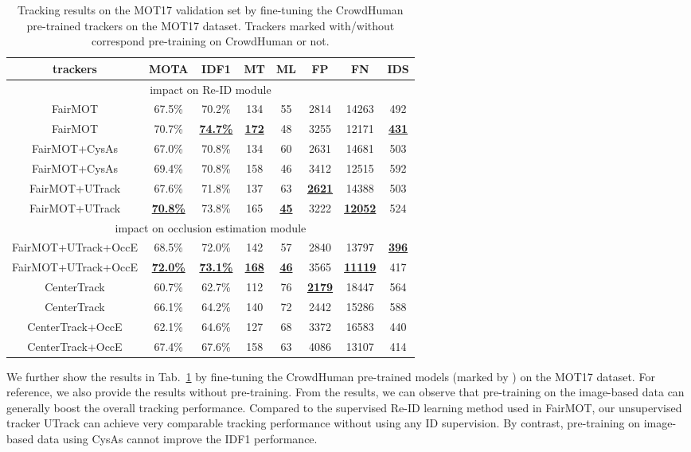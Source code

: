 \documentclass[final,1p,times,twocolumn]{elsarticle}
\newcommand{\tref}[1]{Tab.~\ref{#1}}
\begin{document}
	
	\begin{table}
		\caption{Tracking results on the MOT17 validation set by fine-tuning the CrowdHuman pre-trained trackers on the MOT17 dataset. Trackers marked with/without  correspond pre-training on CrowdHuman or not.
		}
		\setlength{\tabcolsep}{1.2pt}
		\centering
\scriptsize
		\begin{tabular}{c|c|c|c|c|c|c|c}
			\hline
			trackers  &MOTA &IDF1  &MT &ML &FP &FN  &IDS  \\
			\hline
			\multicolumn{8}{c}{impact on Re-ID module}\\
			\hline
			FairMOT \cite{zhang2020fairmot} &67.5\% &70.2\% &134 &55 &2814 &14263 &492 \\
			FairMOT \cite{zhang2020fairmot} &70.7\% &\underline{\bf74.7\%} &\underline{\bf172} &48 &3255 &12171 &\underline{\bf431} \\
			\hline
			FairMOT+CysAs \cite{wang2020cycas} &67.0\% &70.8\% &134 &60 &2631 &14681 &503  \\
			FairMOT+CysAs \cite{wang2020cycas} &69.4\% &70.8\% &158 &46 &3412 &12515 &592  \\
			\hline
			FairMOT+UTrack &67.6\% &71.8\% &137 &63 &\underline{\bf2621} &14388 &503 \\
			FairMOT+UTrack  &\underline{\bf70.8\%} &73.8\% &165 &\underline{\bf45} &3222 &\underline{\bf12052} &524 \\
			\hline
			\hline
			\multicolumn{8}{c}{impact on occlusion estimation module}\\
			\hline
			FairMOT+UTrack+OccE &68.5\% &72.0\% &142 &57 &2840 &13797 &\underline{\bf396} \\
			FairMOT+UTrack+OccE &\underline{\bf72.0\%} &\underline{\bf73.1\%} &\underline{\bf168} &\underline{\bf46} &3565 &\underline{\bf11119} &417 \\
			\hline
			CenterTrack\cite{zhou2020tracking}  &60.7\% &62.7\% &112 &76 &\underline{\bf2179} &18447 &564 \\
			CenterTrack\cite{zhou2020tracking}  &66.1\% &64.2\% &140 &72 &2442 &15286 &588 \\
			\hline
			CenterTrack+OccE  &62.1\% &64.6\% &127 &68 &3372 &16583 &440 \\
			CenterTrack+OccE  &67.4\% &67.6\% &158 &63 &4086 &13107 &414 \\
			\hline
		\end{tabular}
		\label{pretrain}
	\end{table}	
	
	We further show the results in \tref{pretrain} by fine-tuning the CrowdHuman pre-trained models (marked by ) on the MOT17 dataset. 
	For reference, we also provide the results without pre-training. From the results, we can observe that pre-training on the image-based data can generally boost the overall tracking performance. Compared to the supervised Re-ID learning method used in FairMOT, our unsupervised tracker UTrack can achieve very comparable tracking performance without using any ID supervision. By contrast, pre-training on image-based data using CysAs cannot improve the IDF1 performance.
	
\end{document}

